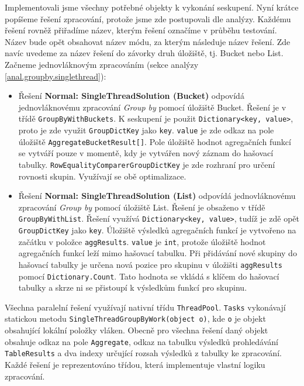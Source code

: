 Implementovali jsme všechny potřebné objekty k vykonání seskupení.
Nyní krátce popíšeme řešení zpracování, protože jsme zde postupovali dle analýzy.
Každému řešení rovněž přiřadíme název, kterým řešení označíme v průběhu testování.
Název bude opět obsahovat název módu, za kterým následuje název řešení.
Zde navíc uvedeme za název řešení do závorky druh úložiště, tj. Bucket nebo List.
Začneme jednovláknovým zpracováním (sekce analýzy \ref{anal.groupby.singlethread}):
\begin{itemize}

\item Řešení \textbf{Normal: SingleThreadSolution (Bucket)} odpovídá jednovláknovému zpracování \textit{Group by} pomocí úložiště Bucket.
Řešení je v třídě \texttt{GroupByWithBuckets}.
K seskupení je použit \texttt{Dictionary<key, value>}, proto je zde využit \texttt{GroupDictKey} jako \texttt{key}.
\texttt{value} je zde odkaz na pole úložiště \texttt{AggregateBucketResult[]}.
Pole úložiště hodnot agregačních funkcí se vytváří pouze v momentě, kdy je vytvářen nový záznam do hašovací tabulky.
\texttt{RowEqualityComparerGroupDictKey} je zde rozhraní pro určení rovnosti skupin.
Využívají se obě optimalizace.

\item  Řešení \textbf{Normal: SingleThreadSolution (List)} odpovídá jednovláknovému zpracování \textit{Group by} pomocí úložiště List.
Řešení je obsaženo v třídě \texttt{GroupByWithList}.
Řešení využívá \texttt{Dictionary<key, value>}, tudíž je zdě opět \texttt{GroupDictKey} jako \texttt{key}.
Úložiště výsledků agregačních funkcí je vytvořeno na začátku v položce \texttt{aggResults}.
\texttt{value} je \texttt{int}, protože úložiště hodnot agregačních funkcí leží mimo hašovací tabulku.
Při přidávání nové skupiny do hašovací tabulky je určena nová pozice pro skupinu v úložišti \texttt{aggResults} pomocí \texttt{Dictionary.Count}.
Tato hodnota se vkládá s klíčem do hašovací tabulky a skrze ni se přistoupí k výsledkům funkcí pro skupinu.
\end{itemize}
Všechna paralelní řešení využívají nativní třídu \texttt{ThreadPool}.
\texttt{Tasks} vykonávají statickou metodu \texttt{SingleThreadGroupByWork(object o)}, kde \texttt{o} je objekt obsahující lokální položky vláken.
Obecně pro všechna řešení daný objekt obsahuje odkaz na pole \texttt{Aggregate}, odkaz na tabulku výsledků prohledávání \texttt{TableResults} a dva indexy určující rozsah výsledků z tabulky ke zpracování.
Každé řešení je reprezentováno třídou, která implementuje vlastní logiku zpracování.


